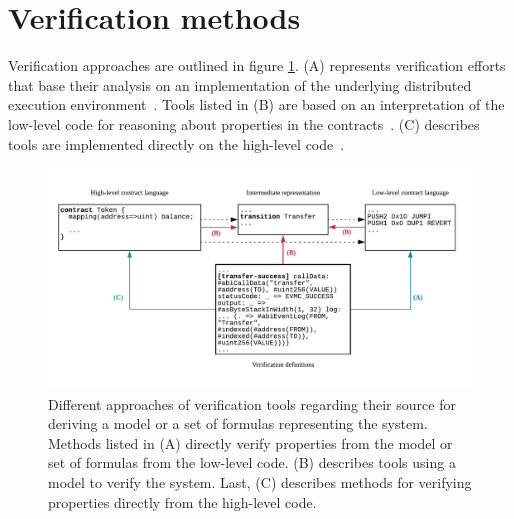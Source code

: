 \section{Verification methods}
\label{verification}

Verification approaches are outlined in figure \ref{fig:verification}. 
(A) represents verification efforts that base their analysis on an implementation of the underlying distributed execution environment~\cite{Hildenbrandt2017,Hirai2017,Bhargavan2016,Grishchenko2018}.
Tools listed in (B) are based on an interpretation of the low-level code for reasoning about properties in the contracts~\cite{Tsankov2017,Mueller2018,Luu2016,Albert2018,Grossman2017,Nikolic2018}. 
(C) describes tools are implemented directly on the high-level code~\cite{Reitwiessner2015Why3,Alt2018}. 


\begin{figure}
\includegraphics[width=\textwidth]{fig/Verification.pdf}
\caption{Different approaches of verification tools regarding their source for deriving a model or a set of formulas representing the system. Methods listed in (A) directly verify properties from the model or set of formulas from the low-level code. (B) describes tools using a model to verify the system. Last, (C) describes methods for verifying properties directly from the high-level code.}
\label{fig:verification}
\end{figure}

